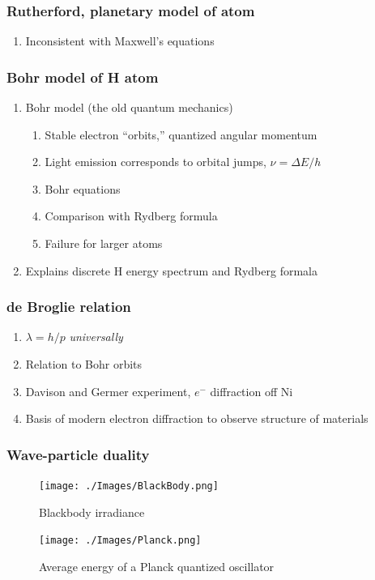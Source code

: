 \documentclass[11pt]{article}
\begin{document}
\subsubsection{Rutherford, planetary model of atom}
\label{sec:orga86206d}
\begin{enumerate}
\item Inconsistent with Maxwell's equations
\end{enumerate}
\subsubsection{Bohr model of H atom}
\label{sec:orgab5e10e}
\begin{enumerate}
\item Bohr model (the old quantum mechanics)
\begin{enumerate}
\item Stable electron ``orbits,'' quantized angular momentum
\item Light emission corresponds to orbital jumps, \(\nu=\Delta E/h\)
\item Bohr equations
\item Comparison with Rydberg formula
\item Failure for larger atoms
\end{enumerate}
\item Explains discrete H energy spectrum and Rydberg formala
\end{enumerate}
\subsubsection{de Broglie relation}
\label{sec:org3b74577}
\begin{enumerate}
\item \(\lambda=h/p\) \emph{universally}
\item Relation to Bohr orbits
\item Davison and Germer experiment, \(e^-\) diffraction off Ni
\item Basis of modern electron diffraction to observe structure of materials
\end{enumerate}
\subsubsection{Wave-particle duality}
\label{sec:orgfa6c94c}

\begin{figure}[htbp]
\centering
\texttt{[image: ./Images/BlackBody.png]}
\caption{Blackbody irradiance}
\end{figure}
\begin{figure}[htbp]
\centering
\texttt{[image: ./Images/Planck.png]}
\caption{Average energy of a Planck quantized oscillator}
\end{figure}
\end{document}
